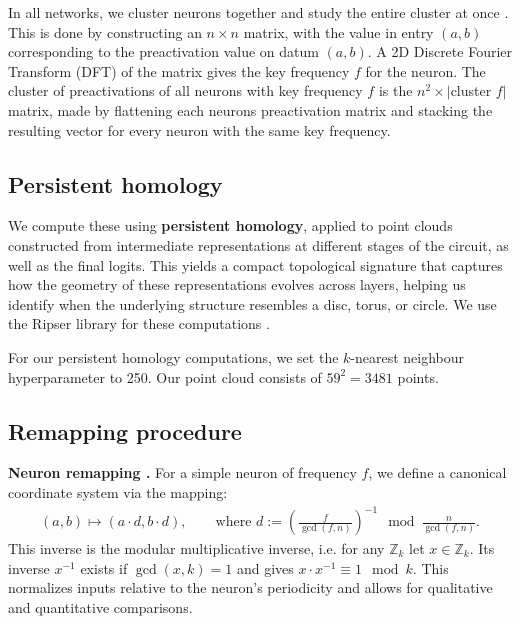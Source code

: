 \documentclass{article} %
\theoremstyle{plain}
\theoremstyle{definition}
\newtheorem{empirical fact}[theorem]{Empirical Fact}
\begin{document}
In all networks, we cluster neurons together and study the entire cluster at once \cite{mccracken2025uncoveringuniversalabstractalgorithm}. This is done by constructing an $n\times n$ matrix, with the value in entry $(a, b)$ corresponding to the preactivation value on datum $(a,b)$.
A 2D Discrete Fourier Transform (DFT) of the matrix gives the key frequency $f$ for the neuron.
The cluster of preactivations of all neurons with key frequency $f$ is the $n^2 \times |$cluster $f|$ matrix, made by flattening each neurons preactivation matrix and stacking the resulting vector for every neuron with the same key frequency.

\subsection{Persistent homology}\label{app:persistent-homology}

We compute these using \textbf{persistent homology}, applied to point clouds constructed from intermediate representations at different stages of the circuit, as well as the final logits. This yields a compact topological signature that captures how the geometry of these representations evolves across layers, helping us identify when the underlying structure resembles a disc, torus, or circle. We use the Ripser library for these computations \cite{Bauer2021Ripser, de_Silva_2011, ctralie2018ripser}.

For our persistent homology computations, we set the $k$-nearest neighbour hyperparameter to 250. Our point cloud consists of $59^2=3481$ points.

\subsection{Remapping procedure}\label{app:remapping}

\textbf{Neuron remapping \citep{mccracken2025uncoveringuniversalabstractalgorithm}.} For a simple neuron of frequency $f$, we define a canonical coordinate system via the mapping:
\begin{align}
    (a,b)\mapsto (a\cdot d,b\cdot d),  \quad\quad \text{where }
    d:= \left(\frac{f}{\gcd(f,n)}\right)^{-1} \mod \frac{n}{\gcd(f,n)} .\label{eq:remapping}
\end{align}
This inverse is the modular multiplicative inverse, i.e. for any $\mathbb{Z}_k$ let $x\in \mathbb{Z}_k$. Its inverse $x^{-1}$ exists if $\gcd(x,k)=1$ and gives $x\cdot x^{-1}\equiv 1 \mod k$. This normalizes inputs relative to the neuron's periodicity and allows for qualitative and quantitative comparisons. 
\end{document}
